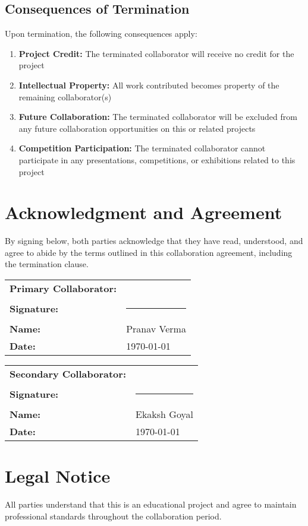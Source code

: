 \documentclass[12pt,a4paper]{article}
\begin{document}
\subsection*{Consequences of Termination}

Upon termination, the following consequences apply:

\begin{enumerate}
    \item \textbf{Project Credit:} The terminated collaborator will receive no credit for the project
    \item \textbf{Intellectual Property:} All work contributed becomes property of the remaining collaborator(s)
    \item \textbf{Future Collaboration:} The terminated collaborator will be excluded from any future collaboration opportunities on this or related projects
    \item \textbf{Competition Participation:} The terminated collaborator cannot participate in any presentations, competitions, or exhibitions related to this project
\end{enumerate}

\vspace{1cm}

\section*{Acknowledgment and Agreement}

By signing below, both parties acknowledge that they have read, understood, and agree to abide by the terms outlined in this collaboration agreement, including the termination clause.

\vspace{1cm}

\begin{tabular}{ll}
\textbf{Primary Collaborator:} & \\
\textbf{Signature:} & \rule{5cm}{0.4pt} \\
\textbf{Name:} & Pranav Verma \\
\textbf{Date:} & \today \\
\end{tabular}

\vspace{1cm}

\begin{tabular}{ll}
\textbf{Secondary Collaborator:} & \\
\textbf{Signature:} & \rule{5cm}{0.4pt} \\
\textbf{Name:} & Ekaksh Goyal \\
\textbf{Date:} & \today \\
\end{tabular}

\vspace{1cm}

\section*{Legal Notice}

All parties understand that this is an educational project and agree to maintain professional standards throughout the collaboration period.
\end{document}
